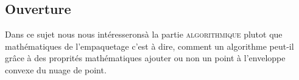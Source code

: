 \documentclass[a4paper, 12pt]{article}
\begin{document}
            \vspace{1cm}
        \subsection{Ouverture}
            \indent{    } Dans ce sujet nous nous intéresseronsà la partie \textsc{algorithmique} plutot que mathématiques de l'empaquetage c'est à dire, comment un
            algorithme peut-il grâce à des proprités mathématiques ajouter ou non un point à l'enveloppe convexe du nuage de point.


    \newpage
\end{document}
